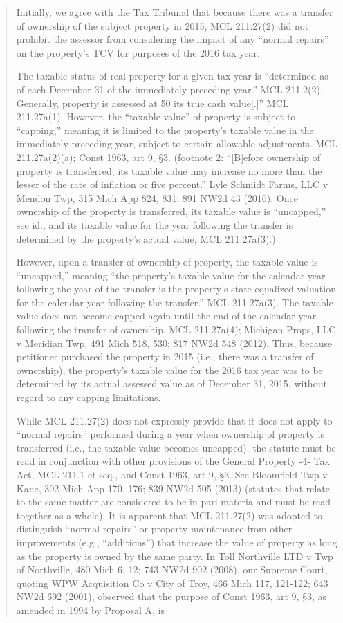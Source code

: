 \documentclass[12pt,\documentclassflag]{michiganCourtOfAppealsBrief}
\begin{document}
\begin{quotation}
  Initially, we agree with the Tax Tribunal that because there was a transfer of ownership of the
subject property in 2015, MCL 211.27(2) did not prohibit the assessor from considering the impact
of any ``normal repairs'' on the property's TCV for purposes of the 2016 tax year.

The taxable status of real property for a given tax year is ``determined as of each December
31 of the immediately preceding year.'' MCL 211.2(2). Generally, property is assessed at 50%
its true cash value[.]'' MCL 211.27a(1). However, the ``taxable value'' of property is subject to
``capping,'' meaning it is limited to the property's taxable value in the immediately preceding year,
subject to certain allowable adjustments. MCL 211.27a(2)(a); Const 1963, art 9, \S 3. (footnote 2:
``[B]efore ownership of property is transferred, its taxable value may increase no more than the
lesser of the rate of inflation or five percent.'' Lyle Schmidt Farms, LLC v Mendon Twp, 315 Mich
App 824, 831; 891 NW2d 43 (2016). Once ownership of the property is transferred, its taxable
value is ``uncapped,'' see id., and its taxable value for the year following the transfer is determined
by the property's actual value, MCL 211.27a(3).)

 However,
upon a transfer of ownership of property, the taxable value is ``uncapped,'' meaning ``the property's
taxable value for the calendar year following the year of the transfer is the property's state
equalized valuation for the calendar year following the transfer.'' MCL 211.27a(3). The taxable
value does not become capped again until the end of the calendar year following the transfer of
ownership. MCL 211.27a(4); Michigan Props, LLC v Meridian Twp, 491 Mich 518, 530; 817
NW2d 548 (2012). Thus, because petitioner purchased the property in 2015 (i.e., there was a
transfer of ownership), the property's taxable value for the 2016 tax year was to be determined by
its actual assessed value as of December 31, 2015, without regard to any capping limitations.

While MCL 211.27(2) does not expressly provide that it does not apply to ``normal repairs''
performed during a year when ownership of property is transferred (i.e., the taxable value becomes
uncapped), the statute must be read in conjunction with other provisions of the General Property
-4-
Tax Act, MCL 211.1 et seq., and Const 1963, art 9, \S 3. See Bloomfield Twp v Kane, 302 Mich
App 170, 176; 839 NW2d 505 (2013) (statutes that relate to the same matter are considered to be
in pari materia and must be read together as a whole). It is apparent that MCL 211.27(2) was
adopted to distinguish ``normal repairs'' or property maintenance from other improvements (e.g.,
``additions'') that increase the value of property as long as the property is owned by the same party.
In Toll Northville LTD v Twp of Northville, 480 Mich 6, 12; 743 NW2d 902 (2008), our Supreme
Court, quoting WPW Acquisition Co v City of Troy, 466 Mich 117, 121-122; 643 NW2d 692
(2001), observed that the purpose of Const 1963, art 9, \S 3, as amended in 1994 by Proposal A, is


\end{quotation}
\end{document}
